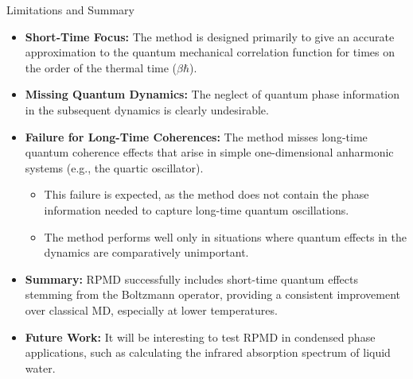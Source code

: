 \begin{frame}{Limitations and Summary}

\begin{itemize}
    \item \textbf{Short-Time Focus:} The method is designed primarily to give an accurate approximation to the quantum mechanical correlation function for times on the order of the thermal time ($\beta\hbar$).
    
    \item \textbf{Missing Quantum Dynamics:} The neglect of quantum phase information in the subsequent dynamics is clearly undesirable.
    
    \item \textbf{Failure for Long-Time Coherences:} The method misses long-time quantum coherence effects that arise in simple one-dimensional anharmonic systems (e.g., the quartic oscillator).
    \begin{itemize}
        \item This failure is expected, as the method does not contain the phase information needed to capture long-time quantum oscillations.
        \item The method performs well only in situations where quantum effects in the dynamics are comparatively unimportant.
    \end{itemize}
    
    \item \textbf{Summary:} RPMD successfully includes short-time quantum effects stemming from the Boltzmann operator, providing a consistent improvement over classical MD, especially at lower temperatures.
    
    \item \textbf{Future Work:} It will be interesting to test RPMD in condensed phase applications, such as calculating the infrared absorption spectrum of liquid water.
\end{itemize}
\end{frame}
